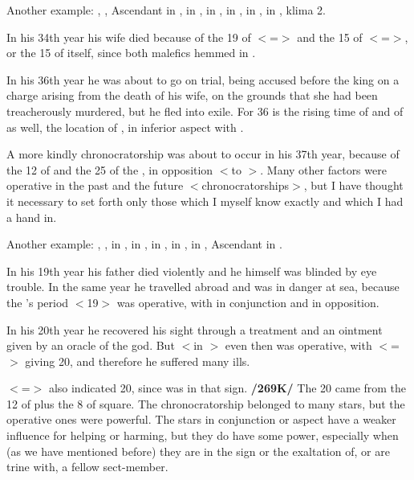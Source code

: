 Another example: \Sun, \Mercury, Ascendant in \Sagittarius, \Moon\xspace in \Cancer, \Saturn\xspace in \Leo, \Jupiter\xspace in
\Capricorn, \Mars\xspace in \Aquarius, \Venus\xspace in \Scorpio, klima 2. 

In his 34th year his wife died because of the 19 of \Leo\xspace $<$=\Sun$>$ and the 15 of \Scorpio\xspace $<$=\Mars$>$, or the 15 of \Mars\xspace itself, since both malefics hemmed in \Venus. 

In his 36th year he was about to go on trial, being accused before the king on a charge arising from the death of his wife, on the grounds that she had been treacherously murdered, but he fled into exile. For
36 is the rising time of \Leo\xspace and of \Scorpio\xspace as well, the location of \Venus, in inferior aspect with \Saturn. 

A more kindly chronocratorship was about to occur in his 37th year, because of the 12 of \Jupiter\xspace and the 25 of the \Moon, in opposition $<$to \Jupiter$>$. Many other factors were operative in the past and the future $<$chronocratorships$>$, but I have thought it necessary to set forth only those which I myself know exactly
and which I had a hand in.

Another example: \Sun, \Mars, \Venus\xspace in \Sagittarius, \Moon\xspace in \Libra, \Saturn\xspace in \Gemini, \Jupiter\xspace in
\Virgo, \Mercury\xspace in \Scorpio, Ascendant in \Capricorn. 

In his 19th year his father died violently and he himself was blinded by eye trouble. In the same year he travelled abroad and was in danger at sea, because the \Sun’s period $<$19$>$ was operative, with \Mars\xspace in conjunction and \Saturn in opposition. 

In his 20th year he recovered his sight through a treatment and an ointment given by an oracle of the god. But \Saturn\xspace $<$in
\Gemini$>$ even then was operative, with \Gemini\xspace $<$=\Mercury$>$ giving 20, and therefore he suffered many ills.

\Virgo $<$=\Mercury$>$ also indicated 20, since \Jupiter was in that sign. \textbf{/269K/} The 20 came from the 12 of \Jupiter\xspace plus the 8 of \Venus\xspace square. The chronocratorship belonged to many stars, but the operative ones were powerful. The stars in conjunction or aspect have a weaker influence for helping or harming, but they do have some power, especially when (as we have mentioned before) they are in the sign or the exaltation of, or are trine with, a fellow sect-member. 

